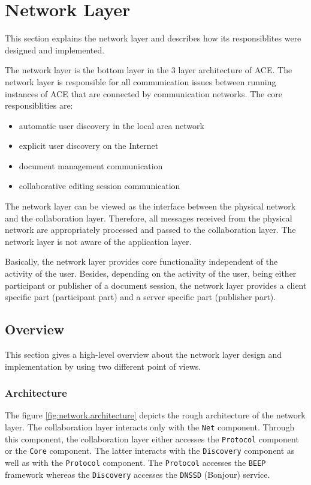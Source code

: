 \chapter{Network Layer}
\label{chapter:networklayer}

This section explains the network layer and describes how its responsiblites were designed and implemented.

The network layer is the bottom layer in the 3 layer architecture of ACE. The network layer is responsible for all communication issues between running instances of ACE that are connected by communication networks. The core responsiblities are:

\begin{itemize}
 \item automatic user discovery in the local area network
 \item explicit user discovery on the Internet
 \item document management communication
 \item collaborative editing session communication
\end{itemize}

The network layer can be viewed as the interface between the physical network and the collaboration layer. Therefore, all messages received from the physical network are appropriately processed and passed to the collaboration layer. The network layer is not aware of the application layer.

Basically, the network layer provides core functionality independent of the activity of the user. Besides, depending on the activity of the user, being either participant or publisher of a document session, the network layer provides a client specific part (participant part) and a server specific part (publisher part).


\section{Overview}

This section gives a high-level overview about the network layer design and implementation by using two different point of views.

\subsection{Architecture}

The figure \ref{fig:network.architecture} depicts the rough architecture of the network layer. The collaboration layer interacts only with the \texttt{Net} component. Through this component, the collaboration layer either accesses the \texttt{Protocol} component or the \texttt{Core} component. The latter interacts with the \texttt{Discovery} component as well as with the \texttt{Protocol} component. The \texttt{Protocol} accesses the \texttt{BEEP} framework whereas the \texttt{Discovery} accesses the \texttt{DNSSD} (Bonjour) service.

